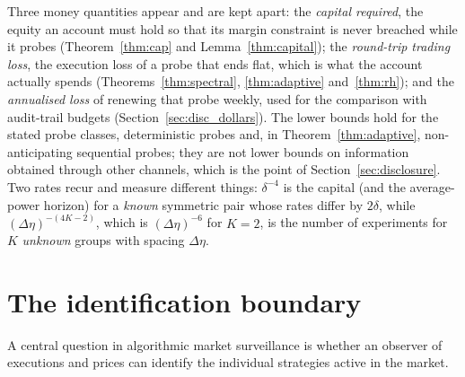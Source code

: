 \documentclass[12pt]{article}
\theoremstyle{definition}
\theoremstyle{remark}
\begin{document}
Three money quantities appear and are kept apart: the \emph{capital required}, the equity an account must hold so that its margin constraint is never breached while it probes (Theorem~\ref{thm:cap} and Lemma~\ref{thm:capital}); the \emph{round-trip trading loss}, the execution loss of a probe that ends flat, which is what the account actually spends (Theorems~\ref{thm:spectral}, \ref{thm:adaptive} and~\ref{thm:rh}); and the \emph{annualised loss} of renewing that probe weekly, used for the comparison with audit-trail budgets (Section~\ref{sec:disc_dollars}). The lower bounds hold for the stated probe classes, deterministic probes and, in Theorem~\ref{thm:adaptive}, non-anticipating sequential probes; they are not lower bounds on information obtained through other channels, which is the point of Section~\ref{sec:disclosure}. Two rates recur and measure different things: $\delta^{-4}$ is the capital (and the average-power horizon) for a \emph{known} symmetric pair whose rates differ by $2\delta$, while $(\Delta\eta)^{-(4K-2)}$, which is $(\Delta\eta)^{-6}$ for $K=2$, is the number of experiments for $K$ \emph{unknown} groups with spacing $\Delta\eta$.

\section{The identification boundary}\label{sec:ident}

A central question in algorithmic market surveillance is whether an observer of executions and prices can identify the individual strategies active in the market.
\end{document}
